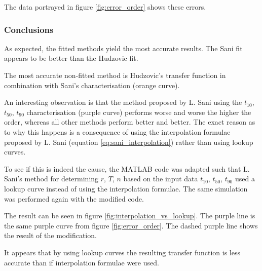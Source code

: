 The data portrayed in figure \ref{fig:error_order} shows these errors.

\subsubsection*{Conclusions}

As expected, the fitted methods yield  the  most  accurate results. The Sani fit
appears to be better than the Hudzovic fit.

The  most  accurate  non-fitted  method  is  Hudzovic's   transfer  function  in
combination with Sani's characterisation (orange curve).

An interesting observation is that the method proposed by L. Sani\cite{ref:sani}
using the $t_{10}$, $t_{50}$,  $t_{90}$ characterisation (purple curve) performs
worse and worse the higher the order, whereas all  other  methods perform better
and  better.  The exact reason as to why this happens is a consequence of  using
the    interpolation     formulae     proposed     by    L.    Sani    (equation
\ref{eq:sani_interpolation}) rather than using lookup curves.

To  see  if  this  is indeed the cause, the MATLAB code was adapted such that L.
Sani's  method  for determining $r$, $T$, $n$ based on the input data  $t_{10}$,
$t_{50}$, $t_{90}$ used  a  lookup  curve  instead  of  using  the interpolation
formulae. The same simulation was performed again with the modified code.

The result can be seen in figure \ref{fig:interpolation_vs_lookup}.  The  purple
line is the same  purple  curve  from  figure  \ref{fig:error_order}. The dashed
purple line shows the result of the modification.

It appears that by using lookup curves the resulting  transfer  function is less
accurate than if interpolation formulae were used.


